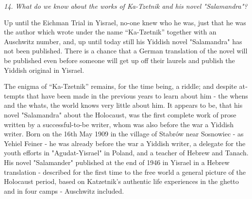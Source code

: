 \documentclass{article}
\begin{document}
\begin{pairs}
\begin{Rightside}
\begin{RTL}
\begin{hebrew}
\endnumbering
\end{hebrew}
\end{RTL}
\end{Rightside}


\begin{Leftside}
\begin{english}
\beginnumbering
\autopar
\emph{
14.
What do we know about the works of Ka-Tzetnik  and his novel "Salamandra"?
}
\newline 
 
 Up until the Eichman Trial in Yisrael, no-one knew who he was, just that he was the author which wrote under the name 
 ``Ka-Tzetnik''
together with an Auschwitz number, and, up until today still his Yiddish novel "Salamandra" has not been published.
There is a chance that a German translation of the novel will be published even before someone
will get up off their laurels and publish the Yiddish original in Yisrael.


 The enigma of ``Ka-Tzetnik'' remains, for the time being, a riddle; and despite attempts that have been made in 
 the previous years to learn about him - the whens and the whats,  
the world knows very little about him.
It appears to be, that his novel "Salamandra" about the Holocaust, was the first complete work of prose written by a successful-to-be writer, whom was also
before the war a Yiddish writer.
Born on the 16th May 1909 in the village of Stabrów near Sosnowiec - as Yehiel Feiner - he was already before the war a Yiddish writer, a delegate 
for the youth efforts in "Agudat-Yisrael" in Poland, and a teacher of Hebrew and Tanach. 
His novel "Salamander" published at the end of 1946 in Yisrael in a Hebrew translation -
described for the first time to the free world a general picture of the Holocaust period,
based on Katzetnik's authentic life experiences in the ghetto and in four camps - Auschwitz included.


\end{english}
\end{Leftside}
\end{pairs}
\end{document}
